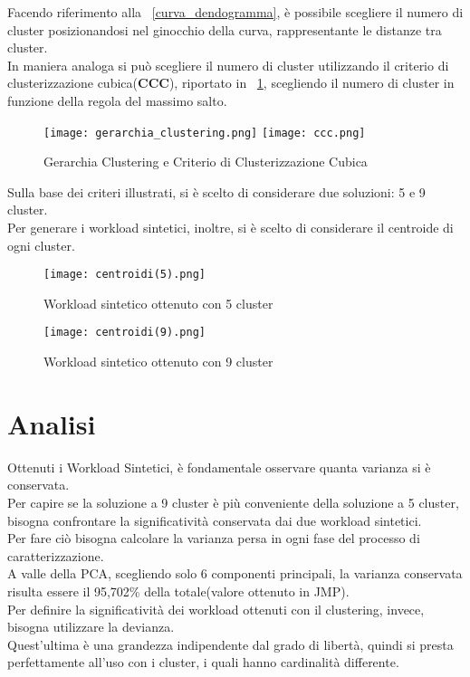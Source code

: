 Facendo riferimento alla \figurename~\ref{curva_dendogramma}, è possibile scegliere
il numero di cluster posizionandosi nel ginocchio della curva, rappresentante le
distanze tra cluster.\\
In maniera analoga si può scegliere il numero di cluster utilizzando il criterio
di clusterizzazione cubica(\textbf{CCC}), riportato in \figurename~\ref{ccc},
scegliendo il numero di cluster in funzione della regola del massimo salto.\\

\begin{figure}[htbp]
\centering
\texttt{[image: gerarchia\_clustering.png]}%
\qquad\qquad
\texttt{[image: ccc.png]}
\caption{Gerarchia Clustering e Criterio di Clusterizzazione Cubica}
\label{ccc}
\end{figure}

\clearpage

Sulla base dei criteri illustrati, si è scelto di considerare due soluzioni:
5 e 9 cluster.\\
Per generare i workload sintetici, inoltre, si è scelto di considerare il
centroide di ogni cluster.\\

\begin{figure}[!htbp]
	\texttt{[image: centroidi(5).png]}
  \caption{Workload sintetico ottenuto con 5 cluster}
  \label{}
\end{figure}

\begin{figure}[!htbp]
	\texttt{[image: centroidi(9).png]}
  \caption{Workload sintetico ottenuto con 9 cluster}
  \label{centroidi9}
\end{figure}

\clearpage
\section{Analisi}
Ottenuti i Workload Sintetici, è fondamentale osservare quanta varianza si è
conservata.\\
Per capire se la soluzione a 9 cluster è più conveniente della soluzione
a 5 cluster, bisogna confrontare la significatività conservata dai due workload sintetici.\\
Per fare ciò bisogna calcolare la varianza persa in ogni fase del processo di
caratterizzazione.\\
A valle della PCA, scegliendo solo 6 componenti principali, la varianza conservata
 risulta essere il 95,702\% della totale(valore ottenuto in JMP).\\
Per definire la significatività dei workload ottenuti con il clustering, invece, bisogna
utilizzare la devianza.\\
Quest'ultima è una grandezza indipendente dal grado di libertà, quindi si presta
perfettamente all'uso con i cluster, i quali hanno cardinalità differente.\\

